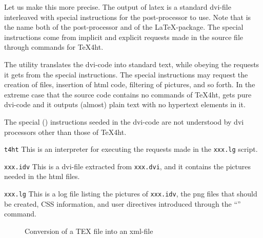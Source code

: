 Let us make this more precise. 
The output of latex is a standard \gls{dvi}-file 
interleaved with special instructions 
for the post-processor  to use. 
Note that  is the name both of the post-processor 
and of the \LaTeX-package. 
The special instructions come from implicit and explicit requests 
made in the source file through commands for TeX4ht. 

The utility  translates the dvi-code into standard text, 
while obeying the requests it gets from the special instructions. 
The special instructions may request the creation of files, 
insertion of html code, filtering of pictures, and so forth. 
In the extreme case that the source code contains no commands of TeX4ht, 
 gets pure dvi-code and it outputs (almost) plain text 
with no hypertext elements in it.

The special () 
instructions seeded in the dvi-code 
are not understood by dvi processors other than those of TeX4ht.

\texttt{t4ht}
This is an interpreter 
for executing the requests made in the \texttt{xxx.lg} script.

\texttt{xxx.idv}
This is a dvi-file extracted from \texttt{xxx.dvi}, 
and it contains the pictures needed in the html files.

\texttt{xxx.lg}
This is a log file listing the pictures of \texttt{xxx.idv}, 
the \gls{png} files that should be created, CSS information, 
and user directives introduced 
through the ``'' command.

\raggedbottom{}


\begin{figure}[!htb]
\centering
{}
\caption{\label{fig:tex2xml}Conversion of a TEX file into an xml-file}
\end{figure}

